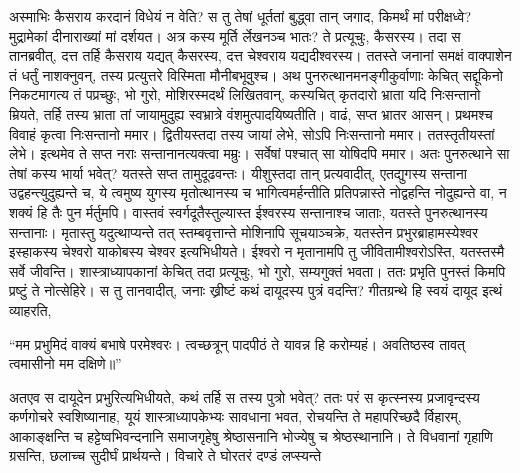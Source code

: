 \vakya अस्माभिः कैसराय करदानं विधेयं न वेति?
\vakya स तु तेषां धूर्ततां बुद्ध्वा तान् जगाद, किमर्थं मां परीक्षध्वे?
\vakya मुद्रामेकां दीनाराख्यां मां दर्शयत। अत्र कस्य मूर्ति र्लेखनञ्च भातः? ते प्रत्यूचुः, कैसरस्य। 
\vakya तदा स तानब्रवीत्, दत्त तर्हि कैसराय यद्यत् कैसरस्य, दत्त चेश्वराय यद्यदीश्वरस्य।
\vakya ततस्ते जनानां समक्षं वाक्पाशेन तं धर्तुं नाशक्नुवन्, तस्य प्रत्युत्तरे विस्मिता मौनीबभूवुश्च।
\vakya अथ पुनरुत्थानमनङ्गीकुर्वाणाः केचित् सद्दूकिनो निकटमागत्य तं पप्रच्छुः,
\vakya भो गुरो, मोशिरस्मदर्थं लिखितवान्, कस्यचित् कृतदारो भ्राता यदि निःसन्तानो म्रियते, तर्हि तस्य भ्राता तां जायामुदुह्य स्वभ्रात्रे वंशमुत्पादयिष्यतीति।
\vakya वाढं, सप्त भ्रातर आसन्। प्रथमश्च विवाहं कृत्वा निःसन्तानो ममार।
\vakya द्वितीयस्तदा तस्य जायां लेभे, सोऽपि निःसन्तानो ममार।
\vakya ततस्तृतीयस्तां लेभे। इत्थमेव ते सप्त नराः सन्तानानत्यक्त्वा मम्रुः।
\vakya सर्वेषां पश्चात् सा योषिदपि ममार।
\vakya अतः पुनरुत्थाने सा तेषां कस्य भार्या भवेत्? यतस्ते सप्त तामुदूढवन्तः।
\vakya यीशुस्तदा तान् प्रत्यवादीत्, एतद्युगस्य सन्ताना उद्वहन्त्युदुह्यन्ते च,
\vakya ये त्वमुष्य युगस्य मृतोत्थानस्य च भागित्वमर्हन्तीति प्रतिपन्नास्ते नोद्वहन्ति नोदुह्यन्ते वा, न शक्यं हि तैः पुन र्मर्तुमपि।
\vakya वास्तवं स्वर्गदूतैस्तुल्यास्त ईश्वरस्य सन्तानाश्च जाताः, यतस्ते पुनरुत्थानस्य सन्तानाः।
\vakya मृतास्तु यदुत्थाप्यन्ते तत् स्तम्बवृत्तान्ते मोशिनापि सूचयाञ्चक्रे, यतस्तेन प्रभुरब्राहामस्येश्वर इस्हाकस्य चेश्वरो याकोबस्य चेश्वर इत्यभिधीयते।
\vakya ईश्वरो न मृतानामपि तु जीवितामीश्वरोऽस्ति, यतस्तस्मै सर्वे जीवन्ति।
\vakya शास्त्राध्यापकानां केचित् तदा प्रत्यूचुः, भो गुरो, सम्यगुक्तं भवता।
\vakya ततः प्रभृति पुनस्तं किमपि प्रष्टुं ते नोत्सेहिरे।
\vakya स तु तानवादीत्, जनाः ख्रीष्टं कथं दायूदस्य पुत्रं वदन्ति?
\vakya गीतग्रन्थे हि स्वयं दायूद इत्थं व्याहरति,
\begin{poem}
\startwithline “मम प्रभुमिदं वाक्यं बभाषे परमेश्वरः।
\vakya त्वच्छत्रून् पादपीठं ते यावन्न हि करोम्यहं।
\pline अवतिष्ठस्व तावत् त्वमासीनो मम दक्षिणे॥”
\end{poem}
\vakya अतएव स दायूदेन प्रभुरित्यभिधीयते, कथं तर्हि स तस्य पुत्रो भवेत्?
\vakya ततः परं स कृत्स्नस्य प्रजावृन्दस्य कर्णगोचरे स्वशिष्यानाह,
\vakya यूयं शास्त्राध्यापकेभ्यः सावधाना भवत, रोचयन्ति ते महापरिच्छदै र्विहारम्, आकाङ्क्षन्ति च हट्टेष्वभिवन्दनानि समाजगृहेषु श्रेष्ठासनानि भोज्येषु च श्रेष्ठस्थानानि।
\vakya ते विधवानां गृहाणि ग्रसन्ति, छलाच्च सुदीर्घं प्रार्थयन्ते। विचारे ते घोरतरं दण्डं लप्स्यन्ते\eoc